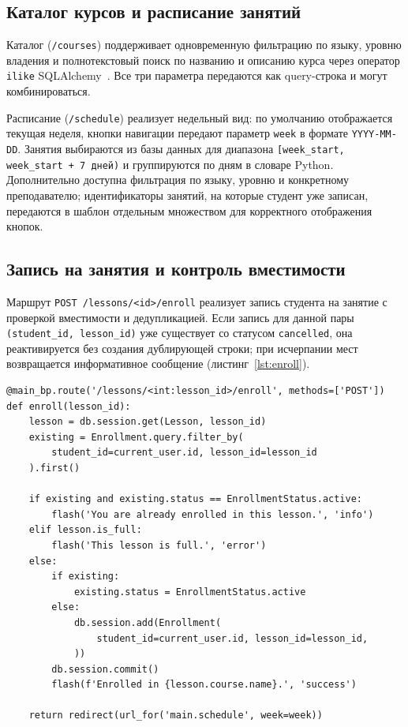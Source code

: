 \subsection{Каталог курсов и расписание занятий}

Каталог (\texttt{/courses}) поддерживает одновременную фильтрацию
по языку, уровню владения и полнотекстовый поиск по названию и описанию
курса через оператор \texttt{ilike} SQLAlchemy~\cite{sqlalchemy_docs}.
Все три параметра передаются как query-строка и могут комбинироваться.

Расписание (\texttt{/schedule}) реализует недельный вид: по умолчанию
отображается текущая неделя, кнопки навигации передают параметр
\texttt{week} в формате \texttt{YYYY-MM-DD}. Занятия выбираются из базы
данных для диапазона \texttt{[week\_start, week\_start + 7 дней)} и
группируются по дням в словаре Python. Дополнительно доступна фильтрация
по языку, уровню и конкретному преподавателю; идентификаторы занятий,
на которые студент уже записан, передаются в шаблон отдельным множеством
для корректного отображения кнопок.

\subsection{Запись на занятия и контроль вместимости}

Маршрут \texttt{POST /lessons/<id>/enroll} реализует запись студента
на занятие с проверкой вместимости и дедупликацией. Если запись для
данной пары \texttt{(student\_id, lesson\_id)} уже существует
со статусом \texttt{cancelled}, она реактивируется без создания
дублирующей строки; при исчерпании мест возвращается информативное
сообщение (листинг~\ref{lst:enroll}).

\begin{lstlisting}[caption={Маршрут записи на занятие (app/main/routes.py)}, label={lst:enroll}]
@main_bp.route('/lessons/<int:lesson_id>/enroll', methods=['POST'])
def enroll(lesson_id):
    lesson = db.session.get(Lesson, lesson_id)
    existing = Enrollment.query.filter_by(
        student_id=current_user.id, lesson_id=lesson_id
    ).first()

    if existing and existing.status == EnrollmentStatus.active:
        flash('You are already enrolled in this lesson.', 'info')
    elif lesson.is_full:
        flash('This lesson is full.', 'error')
    else:
        if existing:
            existing.status = EnrollmentStatus.active
        else:
            db.session.add(Enrollment(
                student_id=current_user.id, lesson_id=lesson_id,
            ))
        db.session.commit()
        flash(f'Enrolled in {lesson.course.name}.', 'success')

    return redirect(url_for('main.schedule', week=week))
\end{lstlisting}

